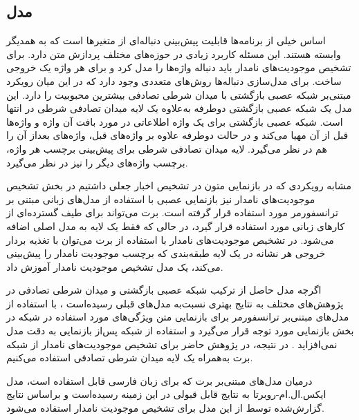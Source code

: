 \begin{table}
\begin{center}
\begin{tabular}{|P{1.2cm}|P{2cm}|P{2cm}|P{8cm}|}
		\end{tabular}
	\end{center}
\end{table}

\subsection{مدل}
اساس خیلی از برنامه‌ها قابلیت پیش‌بینی دنباله‌ای از متغیر‌ها است که به همدیگر وابسته هستند. این مسئله کاربرد زیادی در حوزه‌های مختلف پردازش متن دارد. برای تشخیص موجودیت‌های نامدار باید دنباله واژه‌ها را مدل کرد و برای هر واژه یک خروجی ساخت. برای مدل‌سازی دنباله‌ها روش‌های متعددی وجود دارد که در این میان رویکرد مبتنی‌بر شبکه عصبی بازگشتی با میدان شرطی تصادفی بیشترین محبوبیت را دارد. این مدل یک شبکه عصبی بازگشتی دوطرفه به‌‌علاوه یک لایه میدان تصادفی شرطی در انتها است. شبکه عصبی بازگشتی برای یک واژه اطلاعاتی در مورد بافت آن واژه و واژه‌ها قبل از آن مهیا می‌کند و در حالت دوطرفه علاوه بر واژه‌های قبل، واژه‌های بعداز آن را هم در نظر می‌گیرد. لایه میدان تصادفی شرطی برای پیش‌بینی برچسب هر واژه، برچسب واژه‌های دیگر را نیز در نظر می‌گیرد.

مشابه رویکردی که در بازنمایی متون در تشخیص اخبار جعلی داشتیم در بخش تشخیص موجودیت‌های نامدار نیز بازنمایی عصبی با استفاده از مدل‌های زبانی مبتنی بر ترانسفورمر مورد استفاده قرار گرفته است. برت می‌تواند برای طیف گسترده‌ای از کارهای زبانی مورد استفاده قرار گیرد‌، در حالی که فقط یک لایه به مدل اصلی اضافه می‌شود. در تشخیص موجودیت‌های نامدار‌ با استفاده از برت می‌توان با تغذیه بردار خروجی هر نشانه در یک لایه طبقه‌بندی که برچسب موجودیت نامدار را پیش‌بینی می‌کند‌، یک مدل تشخیص موجودیت نامدار آموزش داد.

اگرچه مدل حاصل از ترکیب شبکه عصبی بازگشتی و میدان شرطی تصادفی در پژوهش‌های مختلف به نتایج بهتری نسبت‌به مدل‌های قبلی رسیده‌است \citep{huang2015bidirectional}، با استفاده از مدل‌های مبتنی‌بر ترانسفورمر برای بازنمایی متن ویژگی‌های مورد استفاده در شبکه  در بخش بازنمایی مورد توجه قرار می‌گیرد و استفاده از شبکه  پس‌از بازنمایی به دقت مدل نمی‌افزاید \citep{Thesis_abdolah}. در نتیجه، در پژوهش حاضر برای تشخیص موجودیت‌های نامدار از شبکه برت به‌همراه یک لایه میدان شرطی تصادفی استفاده می‌کنیم. 

درمیان مدل‌های مبتنی‌بر برت که برای زبان فارسی قابل استفاده است، مدل ایکس.ال.ام-روبرتا به نتایج قابل قبولی در این زمینه رسیده‌است و براساس نتایج گزارش‌شده توسط \cite{Thesis_abdolah} از این مدل برای تشخیص موجودیت نامدار استفاده می‌شود.

